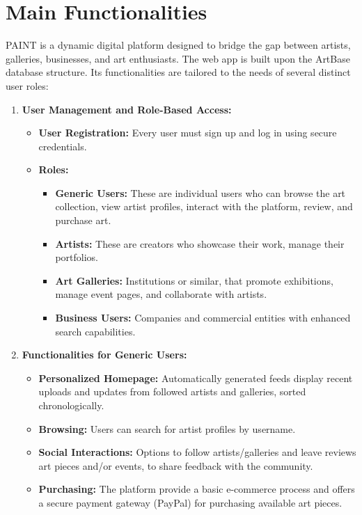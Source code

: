 \section{Main Functionalities}

PAINT is a dynamic digital platform designed to bridge the gap between artists, galleries, businesses, and art enthusiasts. 
The web app is built upon the ArtBase database structure. Its functionalities are tailored to the needs of several distinct user roles:

\begin{enumerate}
    \item \textbf{User Management and Role-Based Access:} 
    \begin{itemize}
        \item \textbf{User Registration:} Every user must sign up and log in using secure credentials.
        \item \textbf{Roles:}
        \begin{itemize}
            \item \textbf{Generic Users:} These are individual users who can browse the art collection, view artist profiles, 
            interact with the platform, review, and purchase art.
            \item \textbf{Artists:} These are creators who showcase their work, manage their portfolios.
            \item \textbf{Art Galleries:} Institutions or similar, that promote exhibitions, manage event pages, and collaborate with artists.
            \item \textbf{Business Users:} Companies and commercial entities with enhanced search capabilities.
        \end{itemize}
    \end{itemize}

    \item \textbf{Functionalities for Generic Users:} 
    \begin{itemize}
        \item \textbf{Personalized Homepage:} Automatically generated feeds display recent uploads and updates from followed artists and galleries, sorted chronologically.
        \item \textbf{Browsing:} Users can search for artist profiles by username.
        \item \textbf{Social Interactions:} Options to follow artists/galleries and leave reviews art pieces and/or events, to share feedback with the community.
        \item \textbf{Purchasing:} The platform provide a basic e-commerce process and offers a secure payment gateway (PayPal) for purchasing available art pieces.
    \end{itemize}


\end{enumerate}
